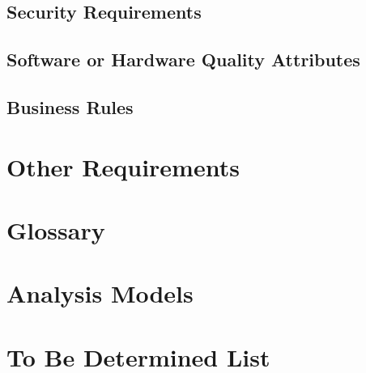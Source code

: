 \documentclass[english]{article}
\numberwithin{equation}{section} %
\begin{document}
\subsection{Security Requirements}
\subsection{Software or Hardware Quality Attributes}
\subsection{Business Rules}

\newpage
\section{Other Requirements}
\appendix
\section{Glossary}
\section{Analysis Models}
\section{To Be Determined List}
\end{document}
